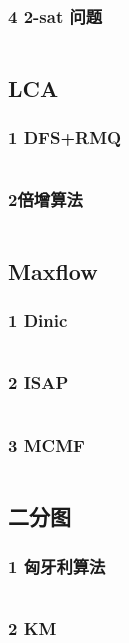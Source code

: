 \documentclass{article}
\begin{document}
\subsubsection{4 2-sat 问题}
\inputminted{c++}{/home/zzuzxy/t3/ACM-template/3 图论/DFS/4 2-sat 问题.cpp}
\subsection{LCA}
\subsubsection{1 DFS+RMQ}
\inputminted{c++}{/home/zzuzxy/t3/ACM-template/3 图论/LCA/1 DFS+RMQ.cpp}
\subsubsection{2倍增算法}
\inputminted{c++}{/home/zzuzxy/t3/ACM-template/3 图论/LCA/2倍增算法.cpp}
\subsection{Maxflow}
\subsubsection{1 Dinic}
\inputminted{c++}{/home/zzuzxy/t3/ACM-template/3 图论/Maxflow/1 Dinic.cpp}
\subsubsection{2 ISAP}
\inputminted{c++}{/home/zzuzxy/t3/ACM-template/3 图论/Maxflow/2 ISAP.cpp}
\subsubsection{3 MCMF}
\inputminted{c++}{/home/zzuzxy/t3/ACM-template/3 图论/Maxflow/3 MCMF.cpp}
\subsection{二分图}
\subsubsection{1 匈牙利算法}
\inputminted{c++}{/home/zzuzxy/t3/ACM-template/3 图论/二分图/1 匈牙利算法.cpp}
\subsubsection{2 KM}
\inputminted{c++}{/home/zzuzxy/t3/ACM-template/3 图论/二分图/2 KM.cpp}
\end{document}
